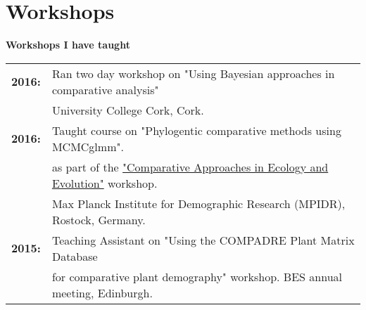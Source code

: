 \documentclass[10pt,a4paper]{article}
\begin{document}
\pagebreak 
\section{Workshops}
\raggedright\textbf{Workshops I have taught}\\
\begin{tabular}{ll}
\textbf{2016:} & Ran two day workshop on "Using Bayesian approaches in comparative analysis"\\
&University College Cork, Cork.\\
\textbf{2016:} & Taught course on "Phylogentic comparative methods using MCMCglmm".\\
& as part of the \href{http://www.demogr.mpg.de/En/education_career/international_advanced_studies_in_demography_3279/past_courses_3280/comparative_approaches_in_ecology_and_evolution_4708/default.htm}{"Comparative Approaches in Ecology and Evolution"} workshop.\\
& Max Planck Institute for Demographic Research (MPIDR), Rostock, Germany.\\
\textbf{2015:} & Teaching Assistant on "Using the COMPADRE Plant Matrix Database\\
& for comparative plant demography" workshop. BES annual meeting, Edinburgh.\\
\end{tabular}
\end{document}
